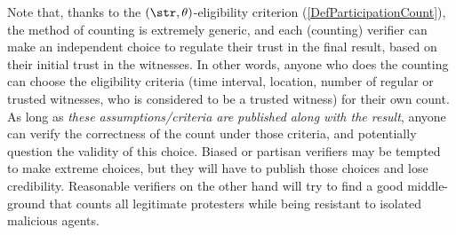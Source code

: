 Note that, thanks to the \((\str,\theta)\)-eligibility criterion
(\cref{DefParticipationCount}), the method of counting is extremely
generic, and each (counting) verifier can make an independent choice to regulate their trust in the final result, based on their initial trust in the witnesses. In other words, anyone who does the counting can choose the eligibility
criteria (time interval, location, number of regular or trusted
witnesses, who is considered to be a trusted witness) for their own count.
As long as \emph{these assumptions/criteria are published along with the 
result}, anyone can verify the correctness of the count under those criteria, 
and potentially question the validity of this choice. Biased or partisan 
verifiers may be tempted to make extreme choices, but they will have to publish 
those choices and lose credibility. Reasonable verifiers on the other hand will 
try to find a good middle-ground that counts all legitimate protesters while 
being resistant to isolated malicious agents.

